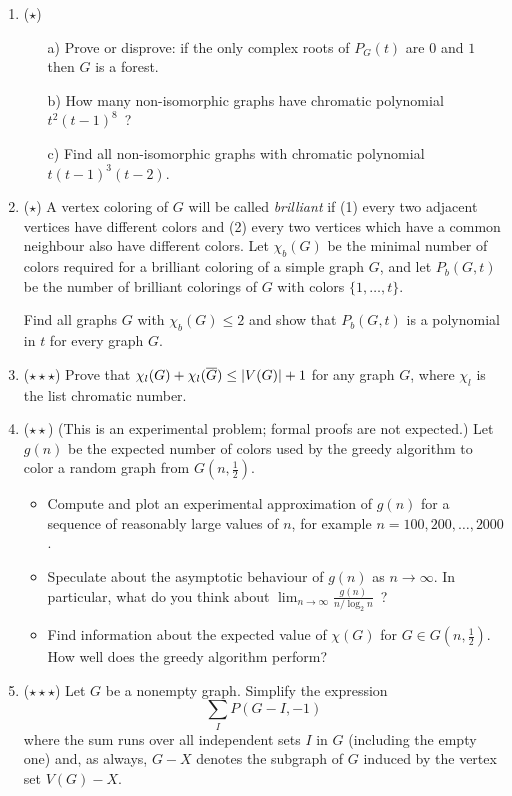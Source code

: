 \begin{enumerate}
\item ($\star$)
\begin{itemize}
\item[a)] Prove or disprove: if the only complex roots of $P_G(t)$ are $0$ and $1$ then $G$ is a forest.
\item[b)] How many non-isomorphic graphs have chromatic polynomial $t^2(t-1)^8$\ ?
\item[c)] Find all non-isomorphic graphs with chromatic polynomial $t(t-1)^3(t-2)$.
\end{itemize}


\item ($\star$) A vertex coloring of $G$ will be called \emph{brilliant} if (1) every two adjacent vertices have different colors and (2) every two vertices which have a common neighbour also have different colors. Let $\chi_b(G)$ be the minimal number of colors required for a brilliant coloring of a simple graph $G$, and let $P_b(G,t)$ be the number of brilliant colorings of $G$ with colors $\{1,\ldots,t\}$. 

Find all graphs $G$ with $\chi_b(G)\leq 2$ and show that $P_b(G,t)$ is a polynomial in $t$ for every graph $G$.


\item ($\star\star\star$) Prove that $\chi_l(G)+\chi_l(\overline{G})\leq |V(G)|+1$ for any graph $G$, where $\chi_l$ is the list chromatic number.


\item ($\star\star$)
(This is an experimental problem; formal proofs are not expected.) Let $g(n)$ be the expected number of colors used by the greedy algorithm to color a random graph from $G(n,\frac12)$. 
\begin{itemize}
\item Compute and plot an experimental approximation of $g(n)$ for a sequence of reasonably large values of $n$, for example $n=100,200,\ldots,2000$.
\item Speculate about the asymptotic behaviour of $g(n)$ as $n\to\infty$. In particular, what do you think about $\lim_{n\to\infty}\frac{g(n)}{n/\log_2{n}}$\ ?
\item Find information about the expected value of $\chi(G)$ for $G\in G(n,\frac12)$. How well does the greedy algorithm perform?
\end{itemize}


\item ($\star\star\star$) Let $G$ be a nonempty graph. Simplify the expression
$$\sum_I P(G-I, -1)$$
where the sum runs over all independent sets $I$ in $G$ (including the empty one) and, as always, $G-X$ denotes the subgraph of $G$ induced by the vertex set $V(G)- X$.



\end{enumerate}
